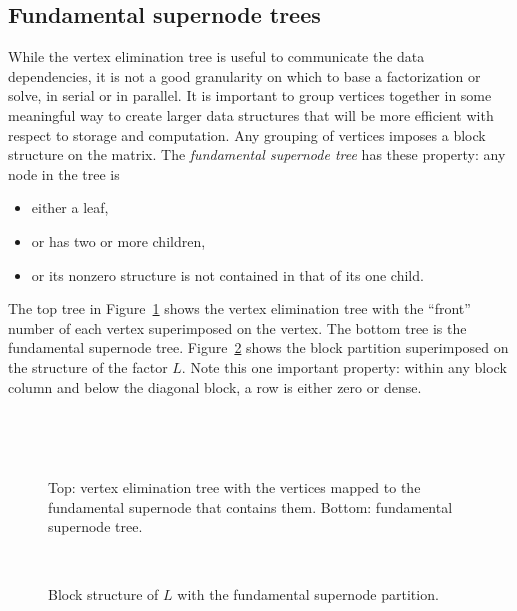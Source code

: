 \subsection{Fundamental supernode trees}
\label{subsection:fs-tree}
\par
While the vertex elimination tree is useful to communicate the data
dependencies, it is not a good granularity on which to
base a factorization or solve, in serial or in parallel.
It is important to group vertices together in some meaningful way
to create larger data structures that will be more efficient with
respect to storage and computation.
Any grouping of vertices imposes a block structure on the matrix.
The {\it fundamental supernode tree} 
\cite{ash89-relaxed}
has these property:
any node in the tree is 
\begin{itemize}
\item either a leaf,
\item or has two or more children,
\item or its nonzero structure 
      is not contained in that of its one child.
\end{itemize}
The top tree in Figure~\ref{fig:fs-trees}
shows the vertex elimination tree with the ``front'' number of each
vertex superimposed on the vertex.
The bottom tree is the fundamental supernode tree.
Figure~\ref{fig:R2D100-fs-mtx} shows the block partition superimposed on
the structure of the factor $L$.
Note this one important property: 
within any block column and below the diagonal block,
a row is either zero or dense.
\par
\begin{figure}[htbp]
\caption{Top: vertex elimination tree with the vertices mapped to
the fundamental supernode that contains them. 
Bottom: fundamental supernode tree.}
\label{fig:fs-trees}
\begin{center}
\mbox{
}
\par
\mbox{
}
\end{center}
\end{figure}
\par
\begin{figure}[htbp]
\caption{Block structure of $L$ with the fundamental supernode
partition.}
\label{fig:R2D100-fs-mtx}
\begin{center}
\mbox{
}
\end{center}
\end{figure}
